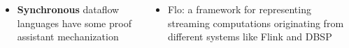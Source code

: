 \documentclass[fleqn,aspectratio=169,10pt]{beamer}
\begin{document}
\begin{frame}[fragile]
\begin{columns}
\begin{column}{.45\textwidth}
\begin{figure}
      \end{figure}
      \vspace*{-3ex}
      \begin{figure}
        \centering
      \end{figure}
    \end{column}
  \end{columns}
    \pause
      \vspace*{-2ex}
  \begin{columns}
    \begin{column}{.45\textwidth}
      \begin{itemize}
        \item \textbf{Synchronous} dataflow languages have some proof assistant mechanization
      \end{itemize}
      \vspace*{-2ex}
      \begin{figure}
        \centering
      \end{figure}
    \end{column}
    \pause
    \begin{column}{.45\textwidth}
      \begin{itemize}
        \item Flo: a framework for representing streaming computations originating from different systems like Flink and DBSP
      \end{itemize}
      \vspace*{-2ex}
      \begin{figure}
        \centering
      \end{figure}
    \end{column}
  \end{columns}
\end{frame}
\end{document}
